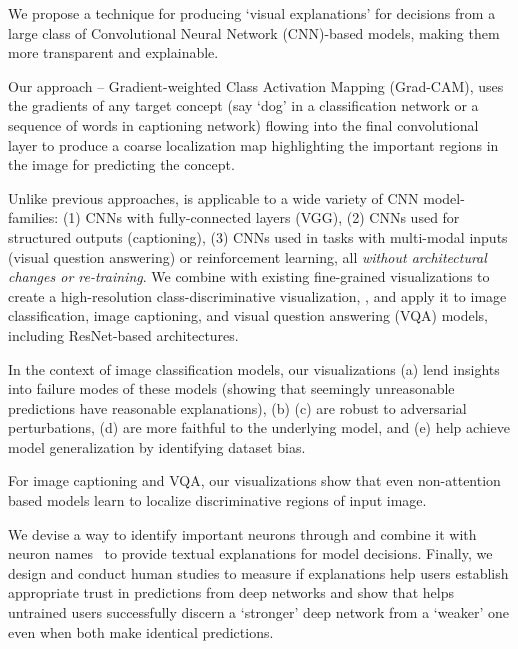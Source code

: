 






\label{sec:abstract}
We propose a technique for producing `visual explanations' for decisions from a large class of Convolutional Neural Network (CNN)-based models, making them more transparent and explainable.

Our approach -- Gradient-weighted Class Activation Mapping (Grad-CAM), uses the gradients of any target concept (say `dog' in a classification network or a sequence of words in captioning network) flowing into the final convolutional layer to produce a coarse localization map highlighting the important regions in the image for predicting the concept.

Unlike previous approaches, \gcam{} is applicable to a wide variety of CNN model-families: 
(1) CNNs with fully-connected layers (\eg VGG), 
(2) CNNs used for structured outputs (\eg captioning), 
(3) CNNs used in tasks with multi-modal inputs (\eg visual question answering) or reinforcement learning, all \emph{without architectural changes or re-training}.
We combine \gcam{} with existing fine-grained visualizations to create a high-resolution class-discriminative visualization, \cgb{},
and apply it to image classification,
image captioning, and visual question answering (VQA) models, including ResNet-based architectures.

In the context of image classification models, our visualizations (a) lend insights into failure modes of these models
(showing that seemingly unreasonable predictions have reasonable explanations),
(b) 
(c) are robust to adversarial perturbations,
(d) are more faithful to the underlying model,
and (e) help achieve model generalization by identifying dataset bias.

For image captioning and VQA, our visualizations show that
even non-attention based models learn to localize discriminative regions of input image.

We devise a way to identify important neurons through \gcam{}
and combine it with neuron names~\cite{netdissect} to provide textual explanations for model decisions.
Finally, we design and conduct human studies to measure if \gcam{} explanations help users
establish appropriate trust in predictions from deep networks and show that \gcam{} helps untrained users
successfully discern a `stronger' deep network from a `weaker' one even when both make identical predictions.
